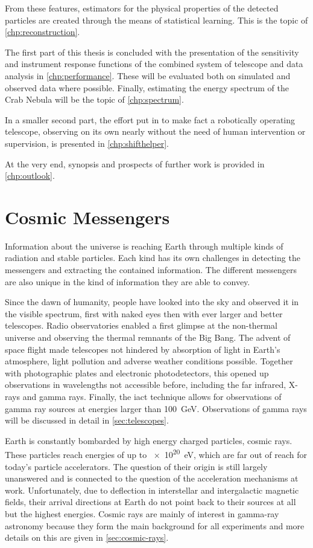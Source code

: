 From these features, estimators for the physical properties of the 
detected particles are created through the means
of statistical learning. 
This is the topic of \autoref{chp:reconstruction}.

The first part of this thesis is concluded with the presentation
of the sensitivity and  instrument response functions
of the combined system of telescope and data analysis in \autoref{chp:performance}.
These will be evaluated both on simulated and observed data where possible.
Finally, estimating the energy spectrum of the Crab Nebula will be the topic of \autoref{chp:spectrum}.

In a smaller second part, the effort put in to make \gls{fact} a robotically operating telescope,
observing on its own nearly without the need of human intervention or supervision,
is presented in \autoref{chp:shifthelper}.

At the very end, synopsis and prospects of further work is provided in \autoref{chp:outlook}.

\section{Cosmic Messengers}\label{sec:messengers}

Information about the universe is reaching Earth through multiple kinds of radiation and stable particles.
Each kind has its own challenges in detecting the messengers and extracting the contained information.
The different messengers are also unique in the kind of information they are able to convey.

Since the dawn of humanity, people have looked into the sky and observed
it in the visible spectrum, first with naked eyes then with ever larger and
better telescopes.
Radio observatories enabled a first glimpse at the non-thermal universe and observing the thermal remnants of the Big Bang.
The advent of space flight made telescopes not hindered by absorption of light
in Earth's atmosphere, light pollution and adverse weather conditions possible.
Together with photographic plates and electronic photodetectors,
this opened up observations in wavelengths not accessible before,
including the far infrared, X-rays and gamma rays.
Finally, the \gls{iact} technique allows for observations of gamma ray sources at energies
larger than \SI{100}{\GeV}.
Observations of gamma rays will be discussed in detail in \autoref{sec:telescopes}.

Earth is constantly bombarded by high energy charged particles, cosmic rays.
These particles reach energies of up to \SI{e20}{\electronvolt}, which are
far out of reach for today's particle accelerators.
The question of their origin is still largely unanswered and is connected
to the question of the acceleration mechanisms at work.
Unfortunately, due to deflection in interstellar and intergalactic magnetic fields,
their arrival directions at Earth do not point back to their sources at all but the
highest energies.
Cosmic rays are mainly of interest in gamma-ray astronomy because they form the 
main background for all experiments and more details on this are given 
in \autoref{sec:cosmic-rays}.

